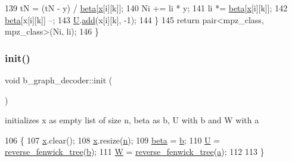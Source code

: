 \begin{DoxyCode}
139     tN = (tN - y) / \hyperlink{classb__graph__decoder_a3e5babfb07af486c1d9e991f65251266}{beta}[\hyperlink{classb__graph__decoder_a6bba2e67984f9733fc60c40dd4956587}{x}[i][k]];
140     Ni += li * y;
141     li *= \hyperlink{classb__graph__decoder_a3e5babfb07af486c1d9e991f65251266}{beta}[\hyperlink{classb__graph__decoder_a6bba2e67984f9733fc60c40dd4956587}{x}[i][k]];
142     \hyperlink{classb__graph__decoder_a3e5babfb07af486c1d9e991f65251266}{beta}[x[i][k]] --;
143     \hyperlink{classb__graph__decoder_ae15e74088bb60a096562a9bdaf380f2c}{U}.\hyperlink{classreverse__fenwick__tree_a942d7f49b37e53ebfec3076d177691d7}{add}(x[i][k], -1);
144   \}
145   \textcolor{keywordflow}{return} pair<mpz\_class, mpz\_class>(Ni, li);
146 \}
\end{DoxyCode}
\mbox{\label{classb__graph__decoder_a9498e8aa7391480cc663bffef3718c6b}} 
\subsubsection{\texorpdfstring{init()}{init()}}
{\footnotesize\ttfamily void b\+\_\+graph\+\_\+decoder\+::init (\begin{DoxyParamCaption}{ }\end{DoxyParamCaption})}



initializes x as empty list of size n, beta as b, U with b and W with a 


\begin{DoxyCode}
106 \{
107   \hyperlink{classb__graph__decoder_a6bba2e67984f9733fc60c40dd4956587}{x}.clear();
108   \hyperlink{classb__graph__decoder_a6bba2e67984f9733fc60c40dd4956587}{x}.resize(\hyperlink{classb__graph__decoder_a2caddd63df6808c95e2ee738f7c77870}{n});
109   \hyperlink{classb__graph__decoder_a3e5babfb07af486c1d9e991f65251266}{beta} = \hyperlink{classb__graph__decoder_a12d1a4a91f342111d2116196cb826317}{b};
110   \hyperlink{classb__graph__decoder_ae15e74088bb60a096562a9bdaf380f2c}{U} = \hyperlink{classreverse__fenwick__tree}{reverse\_fenwick\_tree}(\hyperlink{classb__graph__decoder_a12d1a4a91f342111d2116196cb826317}{b});
111   \hyperlink{classb__graph__decoder_a2c3f91db1f54ddfd411f74d18b01b606}{W} = \hyperlink{classreverse__fenwick__tree}{reverse\_fenwick\_tree}(\hyperlink{classb__graph__decoder_afcf783e4199fb8f9d6828db08bb12333}{a});
112   
113 \}
\end{DoxyCode}


